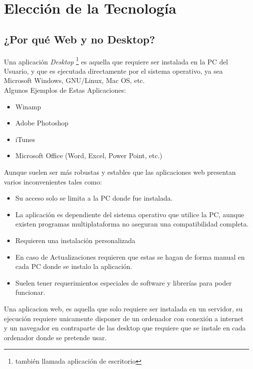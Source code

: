 ﻿\chapter{Elección de la Tecnología}

\section{¿Por qué Web y no Desktop?}

Una aplicación \textit{Desktop} \footnote{también llamada aplicación de escritorio} es aquella que requiere ser instalada en la PC del Usuario, y que es ejecutada directamente por el sistema operativo, ya sea Microsoft Windows, GNU/Linux, Mac OS, etc.\\[0.1cm]

Algunos Ejemplos de Estas Aplicaciones:

\begin{itemize}
    \item Winamp
    \item Adobe Photoshop
    \item iTunes
    \item Microsoft Office (Word, Excel, Power Point, etc.)
\end{itemize}

Aunque suelen ser más robustas y estables que las aplicaciones web presentan varios inconvenientes tales como:

\begin{itemize}
    \item Su acceso solo se limita a la PC donde fue instalada.
    \item La aplicación es dependiente del sistema operativo que utilice la PC, aunque existen programas multiplataforma no aseguran una compatibilidad completa.
    \item Requieren una instalación personalizada
    \item En caso de Actualizaciones requieren que estas se hagan de forma manual en cada PC  donde se instalo la aplicación.
    \item Suelen tener requerimientos especiales de software y librerías para poder funcionar.
\end{itemize}


Una aplicacion web, es aquella que solo requiere ser instalada en un servidor, su ejecución requiere unicamente disponer de un ordenador con conexión a internet y un navegador en contraparte de las desktop que requiere que se instale en cada ordenador donde se pretende usar. \\[0.1cm]


